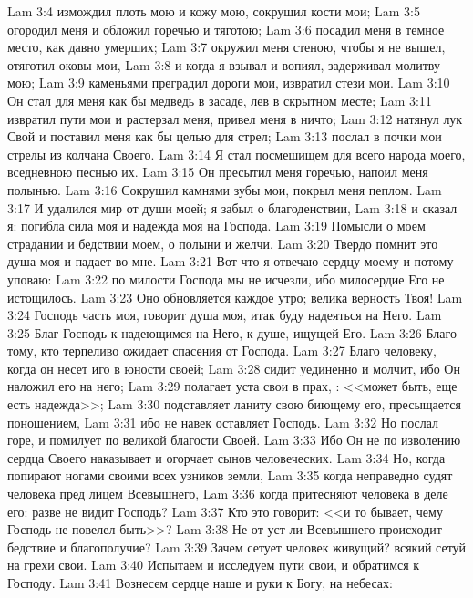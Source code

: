 \vs Lam 3:4 измождил плоть мою и кожу мою, сокрушил кости мои;
\vs Lam 3:5 огородил меня и обложил горечью и тяготою;
\vs Lam 3:6 посадил меня в темное место, как давно умерших;
\vs Lam 3:7 окружил меня стеною, чтобы я не вышел, отяготил оковы мои,
\vs Lam 3:8 и когда я взывал и вопиял, задерживал молитву мою;
\vs Lam 3:9 каменьями преградил дороги мои, извратил стези мои.
\vs Lam 3:10 Он стал для меня как бы медведь в засаде,  лев в скрытном месте;
\vs Lam 3:11 извратил пути мои и растерзал меня, привел меня в ничто;
\vs Lam 3:12 натянул лук Свой и поставил меня как бы целью для стрел;
\vs Lam 3:13 послал в почки мои стрелы из колчана Своего.
\vs Lam 3:14 Я стал посмешищем для всего народа моего, вседневною песнью их.
\vs Lam 3:15 Он пресытил меня горечью, напоил меня полынью.
\vs Lam 3:16 Сокрушил камнями зубы мои, покрыл меня пеплом.
\vs Lam 3:17 И удалился мир от души моей; я забыл о благоденствии,
\vs Lam 3:18 и сказал я: погибла сила моя и надежда моя на Господа.
\vs Lam 3:19 Помысли о моем страдании и бедствии моем, о полыни и желчи.
\vs Lam 3:20 Твердо помнит это душа моя и падает во мне.
\vs Lam 3:21 Вот что я отвечаю сердцу моему и потому уповаю:
\vs Lam 3:22 по милости Господа мы не исчезли, ибо милосердие Его не истощилось.
\vs Lam 3:23 Оно обновляется каждое утро; велика верность Твоя!
\vs Lam 3:24 Господь часть моя, говорит душа моя, итак буду надеяться на Него.
\vs Lam 3:25 Благ Господь к надеющимся на Него, к душе, ищущей Его.
\vs Lam 3:26 Благо тому, кто терпеливо ожидает спасения от Господа.
\vs Lam 3:27 Благо человеку, когда он несет иго в юности своей;
\vs Lam 3:28 сидит уединенно и молчит, ибо Он наложил его на него;
\vs Lam 3:29 полагает уста свои в прах, : <<может быть, еще есть надежда>>;
\vs Lam 3:30 подставляет ланиту свою биющему его, пресыщается поношением,
\vs Lam 3:31 ибо не навек оставляет Господь.
\vs Lam 3:32 Но послал горе, и помилует по великой благости Своей.
\vs Lam 3:33 Ибо Он не по изволению сердца Своего наказывает и огорчает сынов человеческих.
\vs Lam 3:34 Но, когда попирают ногами своими всех узников земли,
\vs Lam 3:35 когда неправедно судят человека пред лицем Всевышнего,
\vs Lam 3:36 когда притесняют человека в деле его: разве не видит Господь?
\vs Lam 3:37 Кто это говорит: <<и то бывает, чему Господь не повелел быть>>?
\vs Lam 3:38 Не от уст ли Всевышнего происходит бедствие и благополучие?
\vs Lam 3:39 Зачем сетует человек живущий? всякий сетуй на грехи свои.
\vs Lam 3:40 Испытаем и исследуем пути свои, и обратимся к Господу.
\vs Lam 3:41 Вознесем сердце наше и руки к Богу,  на небесах:
